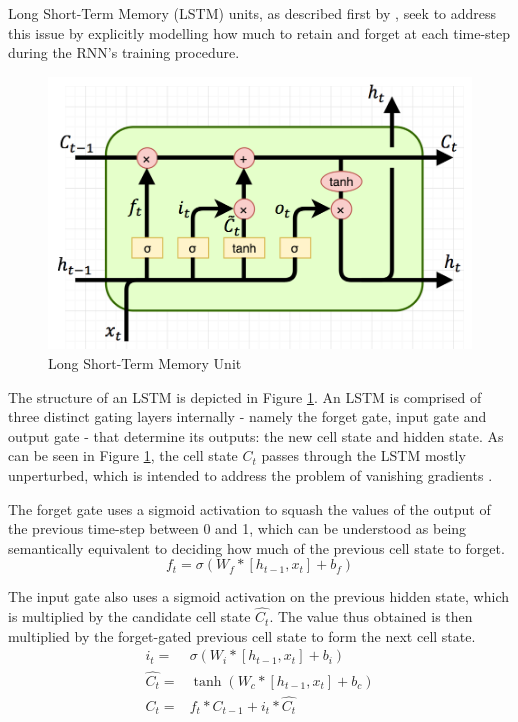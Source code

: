 Long Short-Term Memory (LSTM) units, as described first by \cite{hochreiter1997long}, seek to address this issue by explicitly modelling how much to retain and forget at each time-step during the RNN's training procedure.

\begin{figure}[ht]
	\centering
	\includegraphics[width=\textwidth]{images/lstm}
	\caption{\label{fig:lstm} Long Short-Term Memory Unit}
\end{figure}

The structure of an LSTM is depicted in Figure \ref{fig:lstm}. An LSTM is comprised of three distinct gating layers internally - namely the forget gate, input gate and output gate - that determine its outputs: the new cell state and hidden state. As can be seen in Figure \ref{fig:lstm}, the cell state $C_t$ passes through the LSTM mostly unperturbed, which is intended to address the problem of vanishing gradients \citep{hochreiter1999vanishing}.

The forget gate uses a sigmoid activation to squash the values of the output of the previous time-step between 0 and 1, which can be understood as being semantically equivalent to deciding how much of the previous cell state to forget.
\begin{equation*}
	f_t = \sigma(W_f*[h_{t-1}, x_t] + b_f)
\end{equation*}

The input gate also uses a sigmoid activation on the previous hidden state, which is multiplied by the candidate cell state $\hat{C_t}$. The value thus obtained is then multiplied by the forget-gated previous cell state to form the next cell state.
\begin{align*}
	i_t =
	 & \sigma(W_i*[h_{t-1}, x_t] + b_i) \\
	\hat{C_t} =
	 & \tanh(W_c*[h_{t-1}, x_t] + b_c)  \\
	C_t =
	 & f_t * C_{t-1} + i_t * \hat{C_t}
\end{align*}

